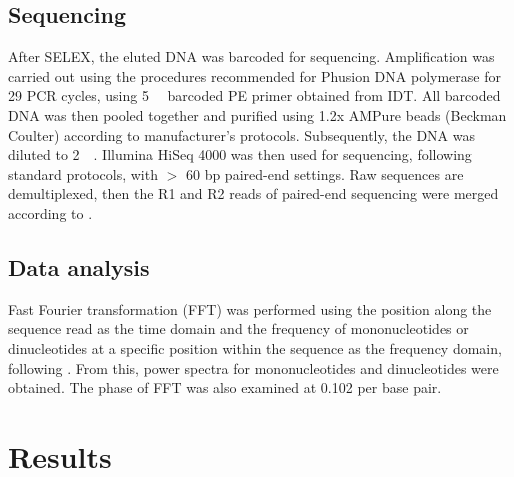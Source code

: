 \documentclass[parskip=full, numbers=noenddot]{scrreprt}
\begin{document}
\subsection{Sequencing}
\label{ssec:emsaselex_methods_seq}

After SELEX, the eluted DNA was barcoded for sequencing.  Amplification was carried out using the procedures recommended for Phusion DNA polymerase for 29 PCR cycles, using \SI{5}{\micro\Molar} barcoded PE primer obtained from IDT.  All barcoded DNA was then pooled together and purified using 1.2x AMPure beads (Beckman Coulter) according to manufacturer's protocols.  Subsequently, the DNA was diluted to \SI{2}{\nano\Molar}.  Illumina HiSeq 4000 was then used for sequencing, following standard protocols, with $>$ 60 bp paired-end settings.  Raw sequences are demultiplexed, then the R1 and R2 reads of paired-end sequencing were merged according to \citet{zhu_interaction_2018}.

\subsection{Data analysis}
\label{ssec:emsaselex_methods_anal}

Fast Fourier transformation (FFT) was performed using the position along the sequence read as the time domain and the frequency of mononucleotides or dinucleotides at a specific position within the sequence as the frequency domain, following \citet{zhu_interaction_2018}.  From this, power spectra for mononucleotides and dinucleotides were obtained.  The phase of FFT was also examined at 0.102 per base pair.

\section{Results}
\label{sec:emsaselex_results}
\end{document}

